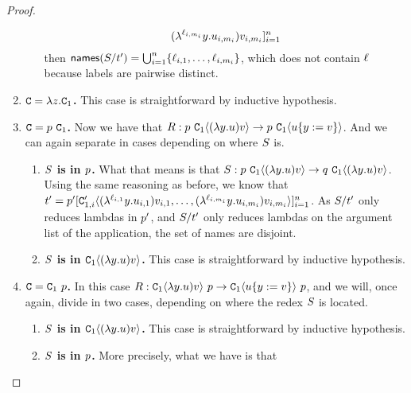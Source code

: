 \begin{proof}
\begin{enumerate}
\begin{enumerate}
\[{    (\lambda^{\ell_{i,m_i}} y. u_{i,m_i}) v_{i,m_i}}]_{i=1}^n\] then
        $\mathsf{names}(S / t') = \bigcup_{i=1}^n \{\ell_{i,1}, \hdots, \ell_{i, m_i}\}$, which
        does not contain $\ell$ because labels are pairwise distinct.
    \end{enumerate}
  \item {\bf $\mathtt{C} = \lambda z. \mathtt{C}_1$.} This case is straightforward by inductive hypothesis.
  \item {\bf $\con = \tmfive \ \con_1$.}
    Now we have that
    $\redex : \tmfive \ \con_1\of{(\lam{\vartwo}{\tmthree}) \tmthreevariant}
      \to \tmfive \ \con_1\of{\subs{\tmthree}{\vartwo}{\tmthreevariant}}$.
    And we can again separate in cases depending on where $S$ is.
    \begin{enumerate}
      \item {\bf $S$ is in $p$.} What that means is that
        $\redextwo : \tmfive \ \con_1\of{(\lam{\vartwo}{\tmthree}) \tmthreevariant}
          \to \tmsix \ \con_1\of{(\lam{\vartwo}{\tmthree}) \tmthreevariant}$.
        Using the same reasoning as before, we know that
        $t' = p' [\mathtt{C}'_{1,i}\langle
          (\lambda^{\ell_{i,1}} y. u_{i,1}) v_{i,1}, \hdots,
          (\lambda^{\ell_{i,m_i}} y. u_{i,m_i}) v_{i,m_i}\rangle
          ]_{i=1}^n$.
        As $S / t'$ only reduces lambdas in $p'$, and $S / t'$ only reduces lambdas
        on the argument list of the application, the set of names are disjoint.
      \item {\bf $S$ is in $\mathtt{C}_1\langle(\lambda y. u) v\rangle$.}
        This case is straightforward by inductive hypothesis.
    \end{enumerate}
  \item {\bf $\con = \con_1 \ \tmfive$.}
    In this case
    $\redex : \con_1\of{\lam{\vartwo}{\tmthree}) \tmthreevariant} \ \tmfive \to
              \con_1\of{\subs{\tmthree}{\vartwo}{\tmthreevariant}} \ \tmfive$,
    and we will, once again, divide in two cases, depending on where the redex $S$ is located.
    \begin{enumerate}
      \item {\bf $S$ is in $\mathtt{C}_1\langle(\lambda y. u) v\rangle$.}
        This case is straightforward by inductive hypothesis.
      \item {\bf $S$ is in $p$.}
        More precisely, what we have is that

\end{enumerate}
\end{enumerate}
\end{proof}
